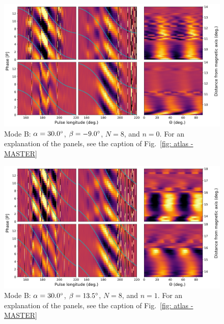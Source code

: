 \begin{figure}
	\begin{center}
		\includegraphics[width=\atlasHeightFrac\textwidth]{Figures/B0031/atlas/B_517030008000_plots}
		\caption[Atlas results: Mode B -- $\alpha=30.0\degr$, $\beta=-9.0\degr$, $N=8$, $n=0$]{Mode B: $\alpha=30.0\degr$, $\beta=-9.0\degr$, $N=8$, and $n=0$. For an explanation of the panels, see the caption of Fig.~\ref{fig: atlas - MASTER} }
		\label{fig: atlas - B_517030008000}
	\end{center}
\end{figure}

\begin{figure}
	\begin{center}
		\includegraphics[width=\atlasHeightFrac\textwidth]{Figures/B0031/atlas/B_517030008001_plots}
		\caption[Atlas results: Mode B -- $\alpha=30.0\degr$, $\beta=13.5\degr$, $N=8$, $n=1$]{Mode B: $\alpha=30.0\degr$, $\beta=13.5\degr$, $N=8$, and $n=1$. For an explanation of the panels, see the caption of Fig.~\ref{fig: atlas - MASTER} }
		\label{fig: atlas - B_517030008001}
	\end{center}
\end{figure}

